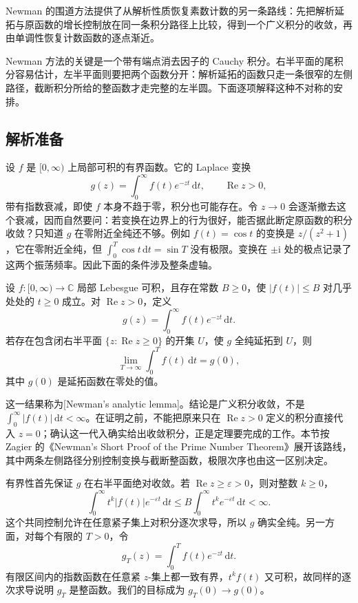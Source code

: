 
Newman 的围道方法提供了从解析性质恢复素数计数的另一条路线：先把解析延拓与原函数的增长控制放在同一条积分路径上比较，得到一个广义积分的收敛，再由单调性恢复计数函数的逐点渐近。

Newman 方法的关键是一个带有端点消去因子的 Cauchy 积分。右半平面的尾积分容易估计，左半平面则要把两个函数分开：解析延拓的函数只走一条很窄的左侧路径，截断积分所给的整函数才走完整的左半圆。下面逐项解释这种不对称的安排。

\subsection{解析准备}
\label{b3:subsec:270601}

设 \(f\) 是 \([0,\infty)\) 上局部可积的有界函数。它的 Laplace 变换
\[
 g(z)=\int_0^\infty f(t)e^{-zt}\,\mathrm dt,
 \qquad \operatorname{Re}z>0,
\]
带有指数衰减，即使 \(f\) 本身不趋于零，积分也可能存在。令 \(z\to0\) 会逐渐撤去这个衰减，因而自然要问：若变换在边界上的行为很好，能否据此断定原函数的积分收敛？只知道 \(g\) 在零附近全纯还不够。例如 \(f(t)=\cos t\) 的变换是 \(z/(z^2+1)\)，它在零附近全纯，但 \(\int_0^T\cos t\,\mathrm dt=\sin T\) 没有极限。变换在 \(\pm\mathrm i\) 处的极点记录了这两个振荡频率。因此下面的条件涉及整条虚轴。

\begin{theorem}\label{b3:thm:27-newman}
设 \(f:[0,\infty)\to\mathbb C\) 局部 Lebesgue 可积，且存在常数 \(B\ge0\)，使 \(|f(t)|\le B\) 对几乎处处的 \(t\ge0\) 成立。对 \(\operatorname{Re}z>0\)，定义
\[
 g(z)=\int_0^\infty f(t)e^{-zt}\,\mathrm dt.
\]
若存在包含闭右半平面 \(\{z:\operatorname{Re}z\ge0\}\) 的开集 \(U\)，使 \(g\) 全纯延拓到 \(U\)，则
\[
 \lim_{T\to\infty}\int_0^T f(t)\,\mathrm dt=g(0),
\]
其中 \(g(0)\) 是延拓函数在零处的值。
\end{theorem}

这一结果称为[Newman's analytic lemma]。结论是广义积分收敛，不是 \(\int_0^\infty|f(t)|\,\mathrm dt<\infty\)。在证明之前，不能把原来只在 \(\operatorname{Re}z>0\) 定义的积分直接代入 \(z=0\)；确认这一代入确实给出收敛积分，正是定理要完成的工作。本节按 Zagier 的《Newman's Short Proof of the Prime Number Theorem》\cite[pp. 706--708]{Zagier1997Newman}展开该路线，其中两条左侧路径分别控制变换与截断整函数，极限次序也由这一区别决定。

有界性首先保证 \(g\) 在右半平面绝对收敛。若 \(\operatorname{Re}z\ge\varepsilon>0\)，则对整数 \(k\ge0\)，
\[
 \int_0^\infty t^k|f(t)|e^{-\varepsilon t}\,\mathrm dt
 \le B\int_0^\infty t^ke^{-\varepsilon t}\,\mathrm dt<\infty.
\]
这个共同控制允许在任意紧子集上对积分逐次求导，所以 \(g\) 确实全纯。另一方面，对每个有限的 \(T>0\)，令
\[
 g_T(z)=\int_0^T f(t)e^{-zt}\,\mathrm dt.
\]
有限区间内的指数函数在任意紧 \(z\)-集上都一致有界，\(t^k f(t)\) 又可积，故同样的逐次求导说明 \(g_T\) 是整函数。我们的目标成为 \(g_T(0)\to g(0)\)。

